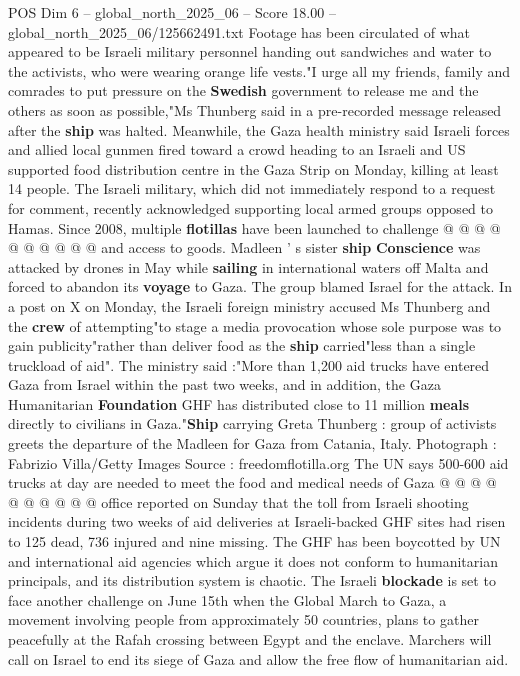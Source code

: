 \begin{textsample}{POS Dim 6 – global\_north\_2025\_06 – Score 18.00 – global\_north\_2025\_06/125662491.txt}
Footage has been circulated of what appeared to be Israeli military personnel handing out sandwiches and water to the activists, who were wearing orange life vests."I urge all my friends, family and comrades to put pressure on the \textbf{Swedish} government to release me and the others as soon as possible,"Ms Thunberg said in a pre-recorded message released after the \textbf{ship} was halted.
Meanwhile, the Gaza health ministry said Israeli forces and allied local gunmen fired toward a crowd heading to an Israeli and US supported food distribution centre in the Gaza Strip on Monday, killing at least 14 people.
The Israeli military, which did not immediately respond to a request for comment, recently acknowledged supporting local armed groups opposed to Hamas.
Since 2008, multiple \textbf{flotillas} have been launched to challenge @ @ @ @ @ @ @ @ @ @ and access to goods.
Madleen ' s sister \textbf{ship} \textbf{Conscience} was attacked by drones in May while \textbf{sailing} in international waters off Malta and forced to abandon its \textbf{voyage} to Gaza.
The group blamed Israel for the attack.
In a post on X on Monday, the Israeli foreign ministry accused Ms Thunberg and the \textbf{crew} of attempting"to stage a media provocation whose sole purpose was to gain publicity"rather than deliver food as the \textbf{ship} carried"less than a single truckload of aid".
The ministry said :"More than 1,200 aid trucks have entered Gaza from Israel within the past two weeks, and in addition, the Gaza Humanitarian \textbf{Foundation} GHF has distributed close to 11 million \textbf{meals} directly to civilians in Gaza."\textbf{Ship} carrying Greta Thunberg : group of activists greets the departure of the Madleen for Gaza from Catania, Italy.
Photograph : Fabrizio Villa/Getty Images Source : freedomflotilla.org The UN says 500-600 aid trucks at day are needed to meet the food and medical needs of Gaza @ @ @ @ @ @ @ @ @ @ office reported on Sunday that the toll from Israeli shooting incidents during two weeks of aid deliveries at Israeli-backed GHF sites had risen to 125 dead, 736 injured and nine missing.
The GHF has been boycotted by UN and international aid agencies which argue it does not conform to humanitarian principals, and its distribution system is chaotic.
The Israeli \textbf{blockade} is set to face another challenge on June 15th when the Global March to Gaza, a movement involving people from approximately 50 countries, plans to gather peacefully at the Rafah crossing between Egypt and the enclave.
Marchers will call on Israel to end its siege of Gaza and allow the free flow of humanitarian aid.

\end{textsample}
